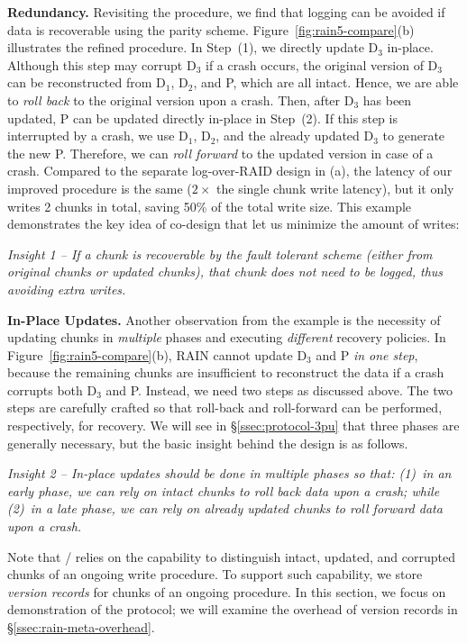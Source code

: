 \noindent
\textbf{Redundancy.}
Revisiting the procedure, we find that logging can be avoided if data is
recoverable using the parity scheme. Figure~\ref{fig:rain5-compare}(b)
illustrates the refined procedure. In Step~(1), we directly update D$_3$
in-place.  Although this step may corrupt D$_3$ if a crash occurs, the original
version of D$_3$ can be reconstructed from D$_1$, D$_2$, and P, which are all
intact.  Hence, we are able to {\em roll back} to the original version upon a
crash. Then, after D$_3$ has been updated,  P can be updated directly
in-place in Step~(2). If this step is interrupted by a crash, we use
D$_1$, D$_2$, and the already updated D$_3$ to generate the new P.  Therefore, we
can {\em roll forward} to the updated version in case of a crash.  Compared to
the separate log-over-RAID design in (a), the latency of our improved procedure
is the same ($2\times$ the single chunk write latency), but it only writes 2
chunks in total, saving 50\% of the total write size.
This example demonstrates the key idea of co-design that let
us minimize the amount of writes:

\emph{Insight 1 -- If a chunk is recoverable by the fault tolerant scheme (either from
original chunks or updated chunks), that chunk does not need to be logged, thus avoiding extra writes.}

\noindent
\textbf{In-Place Updates.} Another observation from the example is the necessity
of updating chunks in \emph{multiple} phases and executing \emph{different} recovery policies.
In Figure~\ref{fig:rain5-compare}(b), RAIN cannot update D$_3$ and P \emph{in one step},
because the remaining chunks are insufficient to reconstruct the data if a crash corrupts both
D$_3$ and P. Instead, we need two steps as discussed above. The two steps are carefully crafted so that roll-back and roll-forward can be performed, respectively, for recovery. We will see in \S\ref{ssec:protocol-3pu} that three phases are generally necessary, but the basic insight behind the design is as follows.

\emph{Insight 2 -- In-place updates should be done in multiple phases so that: (1)~in an early phase, we can rely on intact chunks to roll back data upon a crash; while (2)~in a late phase, we can rely on already updated chunks to roll forward data upon a crash.}

Note that \protocol/ relies on the capability to distinguish intact,
updated, and corrupted chunks of an ongoing write procedure. To support
such capability, we store \emph{version records} for chunks of an ongoing
procedure. In this section, we focus on demonstration of the protocol; we will
examine the overhead of version records in \S\ref{ssec:rain-meta-overhead}.

